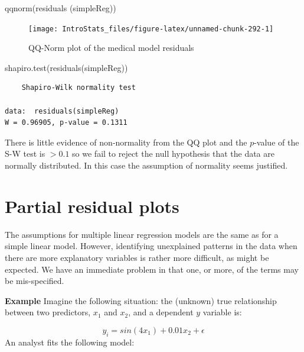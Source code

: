 \documentclass[
  oneside]{krantz}
\newenvironment{Shaded}{\begin{snugshade}}{\end{snugshade}}
\newcommand{\FunctionTok}[1]{\textcolor[rgb]{0.00,0.00,0.00}{#1}}
\newcommand{\NormalTok}[1]{#1}
\begin{document}
\begin{Shaded}
\begin{Highlighting}[]
 \FunctionTok{qqnorm}\NormalTok{(}\FunctionTok{residuals}\NormalTok{ (simpleReg))}
\end{Highlighting}
\end{Shaded}

\begin{figure}

{\centering \texttt{[image: IntroStats\_files/figure-latex/unnamed-chunk-292-1]} 

}

\caption{QQ-Norm plot of the medical model residuals}\label{fig:unnamed-chunk-292}
\end{figure}

\begin{Shaded}
\begin{Highlighting}[]
\FunctionTok{shapiro.test}\NormalTok{(}\FunctionTok{residuals}\NormalTok{(simpleReg))}
\end{Highlighting}
\end{Shaded}

\begin{verbatim}
    Shapiro-Wilk normality test

data:  residuals(simpleReg)
W = 0.96905, p-value = 0.1311
\end{verbatim}

There is little evidence of non-normality from the QQ plot and the \(p\)-value of the S-W test is \(>0.1\) so we fail to reject the null hypothesis that the data are normally distributed. In this case the assumption of normality seems justified.

\hypertarget{partial-residual-plots}{%
\section{Partial residual plots}\label{partial-residual-plots}}

The assumptions for multiple linear regression models are the same as for a simple linear model. However, identifying unexplained patterns in the data when there are more explanatory variables is rather more difficult, as might be expected. We have an immediate problem in that one, or more, of the terms may be mis-specified.

\textbf{Example} Imagine the following situation: the (unknown) true relationship between two predictors, \(x_1\) and \(x_2\), and a dependent \(y\) variable is:

\[y_i= sin (4x_1)+0.01x_2+\epsilon\]
An analyst fits the following model:
\end{document}
